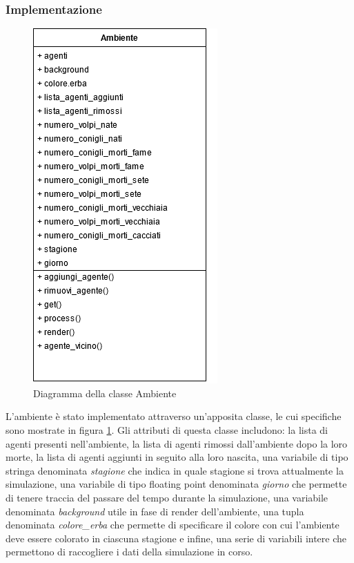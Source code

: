 \documentclass[11pt]{article}
\begin{document}
\subsubsection{Implementazione}
\label{sec:ambienteImplementazione}
\begin{figure}[h!]
     \centering
     \includegraphics[scale = 0.7]{Ambiente.png}
     \caption{Diagramma della classe Ambiente}
     \label{fig:ambienteUML}
\end{figure}

L'ambiente è stato implementato attraverso un'apposita classe, le cui specifiche sono mostrate in figura \ref{fig:ambienteUML}. Gli attributi di questa classe includono: la lista di agenti presenti nell'ambiente, la lista di agenti rimossi dall'ambiente dopo la loro morte, la lista di agenti aggiunti in seguito alla loro nascita, una variabile di tipo stringa denominata \emph{stagione} che indica in quale stagione si trova attualmente la simulazione, una variabile di tipo floating point denominata \emph{giorno} che permette di tenere traccia del passare del tempo durante la simulazione, una variabile denominata \emph{background} utile in fase di render dell'ambiente, una tupla denominata \emph{colore\_erba} che permette di specificare il colore con cui l'ambiente deve essere colorato in ciascuna stagione e infine, una serie di variabili intere che permettono di raccogliere i dati della simulazione in corso.
\end{document}
